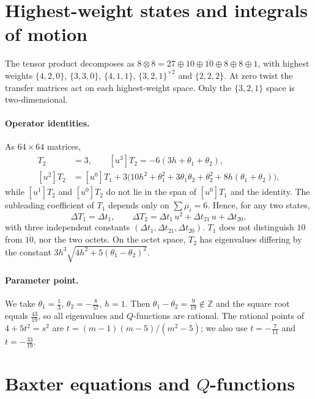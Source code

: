 \documentclass[11pt]{article}
\begin{document}
\section{Highest-weight states and integrals of motion}

The tensor product decomposes as $8\otimes8=27\oplus10\oplus\overline{10}\oplus8\oplus8\oplus1$,
with highest weights $\{4,2,0\}$, $\{3,3,0\}$, $\{4,1,1\}$, $\{3,2,1\}^{\times2}$ and $\{2,2,2\}$.
At zero twist the transfer matrices act on each highest-weight space. Only the $\{3,2,1\}$ space
is two-dimensional.

\paragraph{Operator identities.} As $64\times64$ matrices,
\begin{align}
[u^4]T_2&=3,\qquad [u^3]T_2=-6(3h+\theta_1+\theta_2),\\
[u^2]T_2&=[u^0]T_1+3\big(10h^2+\theta_1^2+3\theta_1\theta_2+\theta_2^2+8h(\theta_1+\theta_2)\big),
\end{align}
while $[u^1]T_2$ and $[u^0]T_2$ do not lie in the span of $[u^0]T_1$ and the identity.
The subleading coefficient of $T_1$ depends only on $\sum\mu_i=6$. Hence, for any two states,
\begin{equation}
\Delta T_1=\Delta t_1,\qquad \Delta T_2=\Delta t_1\,u^2+\Delta t_{21}\,u+\Delta t_{20},
\label{eq:dT}
\end{equation}
with three independent constants $(\Delta t_1,\Delta t_{21},\Delta t_{20})$. $T_1$ does not
distinguish $10$ from $\overline{10}$, nor the two octets. On the octet space, $T_2$ has eigenvalues
differing by the constant $3h^3\sqrt{4h^2+5(\theta_1-\theta_2)^2}$.

\paragraph{Parameter point.} We take $\theta_1=\tfrac13$, $\theta_2=-\tfrac8{57}$, $h=1$. Then
$\theta_1-\theta_2=\tfrac9{19}\notin\mathbb Z$ and the square root equals $\tfrac{43}{19}$, so all
eigenvalues and $Q$-functions are rational. The rational points of $4+5t^2=s^2$ are
$t=(m-1)(m-5)/(m^2-5)$; we also use $t=-\tfrac7{11}$ and $t=-\tfrac{33}{19}$.

\section{Baxter equations and $Q$-functions}
\end{document}
